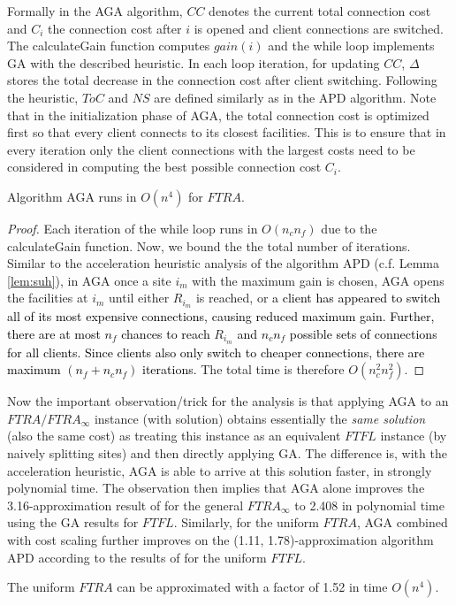 \documentclass[10pt]{llncs}
\begin{document}
Formally in the AGA algorithm, $CC$ denotes the current total connection
cost and $C_{i}$ the connection cost after $i$ is opened and client
connections are switched. The calculateGain function computes $gain\left(i\right)$
and the while loop implements GA with the described heuristic. In
each loop iteration, for updating $CC$, $\Delta$ stores the total
decrease in the connection cost after client switching. Following
the heuristic, $ToC$ and $NS$ are defined similarly as in the APD
algorithm. Note that in the initialization phase of AGA, the total
connection cost is optimized first so that every client connects to
its closest facilities. This is to ensure that in every iteration
only the client connections with the largest costs need to be considered
in computing the best possible connection cost $C_{i}$.
\begin{lemma}
Algorithm AGA runs in $O\left(n^{4}\right)$ for $FTRA$.\label{lem:time-GA}\end{lemma}
\begin{proof}
Each iteration of the while loop runs in $O\left(n_{c}n_{f}\right)$
due to the calculateGain function. Now, we bound the the total number
of iterations. Similar to the acceleration heuristic analysis of the
algorithm APD (c.f. Lemma \ref{lem:suh}), in AGA once a site $i_{m}$
with the maximum gain is chosen, AGA opens the facilities at $i_{m}$
until either $R_{i_{m}}$ is reached, or \textcolor{black}{a client
has appeared to switch all of its most expensive connections, causing
reduced maximum gain. Further, there are at most $n_{f}$ chances
to reach }$R_{i_{m}}$\textcolor{black}{{} and $n_{c}n_{f}$ possible
sets of connections for all clients. Since clients also only switch
to cheaper connections, there are maximum $\left(n_{f}+n_{c}n_{f}\right)$
iterations.} The total time is therefore $O\left(n_{c}^{2}n_{f}^{2}\right)$.
\end{proof}
Now the important observation/trick for the analysis is that applying
AGA to an $FTRA/FTRA_{\infty}$ instance (with solution) obtains essentially
the \textit{same solution} (also the same cost) as treating this instance
as an equivalent $FTFL$ instance (by naively splitting sites) and
then directly applying GA. The difference is, with the acceleration
heuristic, AGA is able to arrive at this solution faster, in strongly
polynomial time. The observation then implies that AGA alone improves
the 3.16-approximation result of \cite{yan2011approximation} for
the general $FTRA_{\infty}$ to 2.408 in polynomial time using the
GA results \cite{Guha03FTFL2.41} for $FTFL$. Similarly, for the
uniform $FTRA$, AGA combined with cost scaling further improves on
the (1.11, 1.78)-approximation algorithm APD according to the results
of \cite{Swamy08FTFL2.076} for the uniform $FTFL$.
\begin{theorem}
The uniform $FTRA$ can be approximated with a factor of 1.52 in time
$O\left(n^{4}\right)$. \label{thm:1.52uniform}
\end{theorem}
\end{document}
